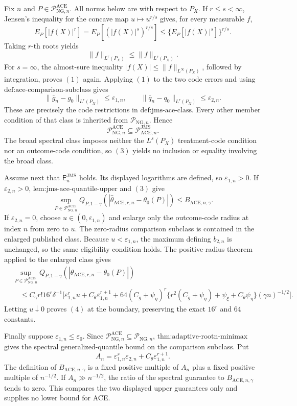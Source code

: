 Fix \(n\) and \(P\in\mathcal P_{\mathrm{NG},n}^{\mathrm{ACE}}\). All norms below are with respect to \(P_X\). If \(r\le s<\infty\), Jensen's inequality for the concave map \(u\mapsto u^{r/s}\) gives, for every measurable \(f\),
\[
 E_P[|f(X)|^r]
 =E_P[(|f(X)|^s)^{r/s}]
 \le\{E_P[|f(X)|^s]\}^{r/s}.
\]
Taking \(r\)-th roots yields
\[
 \|f\|_{L^r(P_X)}\le\|f\|_{L^s(P_X)}. \tag{1}
\]
For \(s=\infty\), the almost-sure inequality \(|f(X)|\le\|f\|_{L^\infty(P_X)}\), followed by integration, proves \((1)\) again. Applying \((1)\) to the two code errors and using \(\text{def:ace-comparison-subclass}\) gives
\[
 \|\bar g_n-g_0\|_{L^r(P_X)}\le\varepsilon_{1,n},
 \qquad
 \|\bar q_n-q_0\|_{L^r(P_X)}\le\varepsilon_{2,n}. \tag{2}
\]
These are precisely the code restrictions in \(\text{def:jms-ace-class}\). Every other member condition of that class is inherited from \(\mathcal P_{\mathrm{NG},n}\). Hence
\[
 \mathcal P_{\mathrm{NG},n}^{\mathrm{ACE}}
 \subseteq\mathcal P_{\mathrm{ACE},n}^{\mathrm{JMS}}. \tag{3}
\]
The broad spectral class imposes neither the \(L^s(P_X)\) treatment-code condition nor an outcome-code condition, so \((3)\) yields no inclusion or equality involving the broad class.

Assume next that \(\mathsf E_n^{\mathrm{JMS}}\) holds. Its displayed logarithms are defined, so \(\varepsilon_{1,n}>0\). If \(\varepsilon_{2,n}>0\), \(\text{lem:jms-ace-quantile-upper}\) and \((3)\) give
\[
 \sup_{P\in\mathcal P_{\mathrm{NG},n}^{\mathrm{ACE}}}
 Q_{P,1-\gamma}(|\widehat\theta_{\mathrm{ACE},r,n}-\theta_0(P)|)
 \le B_{\mathrm{ACE},n,\gamma}. \tag{4}
\]
If \(\varepsilon_{2,n}=0\), choose \(u\in(0,\varepsilon_{1,n})\) and enlarge only the outcome-code radius at index \(n\) from zero to \(u\). The zero-radius comparison subclass is contained in the enlarged published class. Because \(u<\varepsilon_{1,n}\), the maximum defining \(b_{2,n}\) is unchanged, so the same eligibility condition holds. The positive-radius theorem applied to the enlarged class gives
\[
\begin{aligned}
 &\sup_{P\in\mathcal P_{\mathrm{NG},n}^{\mathrm{ACE}}}
 Q_{P,1-\gamma}(|\widehat\theta_{\mathrm{ACE},r,n}-\theta_0(P)|)\\
 &\quad\le C_{\gamma}r!16^r\delta^{-1}
 \Big[\varepsilon_{1,n}^r u+C_{\theta}\varepsilon_{1,n}^{r+1}
 +64(C_g+\psi_{\eta})^r
 \{r^2(C_g+\psi_{\eta})+\psi_{\xi}+C_{\theta}\psi_{\eta}\}
 (\gamma n)^{-1/2}\Big].
\end{aligned}
\]
Letting \(u\downarrow0\) proves \((4)\) at the boundary, preserving the exact \(16^r\) and \(64\) constants.

Finally suppose \(\varepsilon_{1,n}\le\varepsilon_0\). Since \(\mathcal P_{\mathrm{NG},n}^{\mathrm{ACE}}\subseteq\mathcal P_{\mathrm{NG},n}\), \(\text{thm:adaptive-rootn-minimax}\) gives the spectral generalized-quantile bound on the comparison subclass. Put
\[
 A_n=\varepsilon_{1,n}^r\varepsilon_{2,n}+C_{\theta}\varepsilon_{1,n}^{r+1}.
\]
The definition of \(B_{\mathrm{ACE},n,\gamma}\) is a fixed positive multiple of \(A_n\) plus a fixed positive multiple of \(n^{-1/2}\). If \(A_n\gg n^{-1/2}\), the ratio of the spectral guarantee to \(B_{\mathrm{ACE},n,\gamma}\) tends to zero. This compares the two displayed upper guarantees only and supplies no lower bound for ACE.